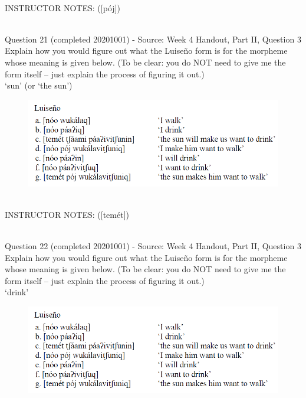\documentclass[12pt]{article}
\begin{document}
~\\
INSTRUCTOR NOTES: ([pój])


~\\

{\large Question 21} (completed 20201001) - Source: Week 4 Handout, Part II, Question 3\\

Explain how you would figure out what the Luiseño form is for the morpheme whose meaning is given below. (To be clear: you do NOT need to give me the form itself -- just explain the process of figuring it out.)\\

‘sun’ (or ‘the sun’)

\begin{figure}[H]
\includegraphics{../images/luiseno.png}
\end{figure}

~\\
INSTRUCTOR NOTES: ([temét])


~\\

{\large Question 22} (completed 20201001) - Source: Week 4 Handout, Part II, Question 3\\

Explain how you would figure out what the Luiseño form is for the morpheme whose meaning is given below. (To be clear: you do NOT need to give me the form itself -- just explain the process of figuring it out.)\\

‘drink’

\begin{figure}[H]
\includegraphics{../images/luiseno.png}
\end{figure}
\end{document}
